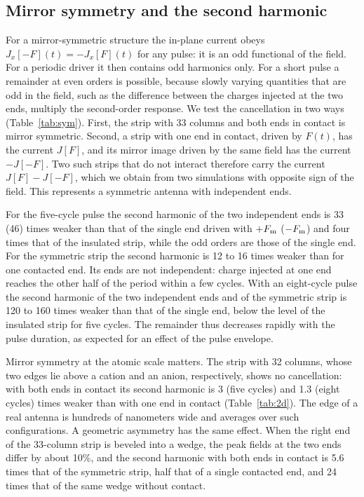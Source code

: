 \documentclass[aps,prl,onecolumn,superscriptaddress,notitlepage]{revtex4-2}
\begin{document}
\subsection{Mirror symmetry and the second harmonic}
For a mirror-symmetric structure the in-plane current obeys $J_x[-F](t)=-J_x[F](t)$ for any pulse:
it is an odd functional of the field. For a periodic driver it then contains odd harmonics only.
For a short pulse a remainder at even orders is possible, because slowly varying quantities that
are odd in the field, such as the difference between the charges injected at the two ends,
multiply the second-order response. We test the cancellation in two ways (Table~\ref{tab:sym}).
First, the strip with 33 columns and both ends in contact is mirror symmetric. Second, a strip with
one end in contact, driven by $F(t)$, has the current $J[F]$, and its mirror image driven by the same
field has the current $-J[-F]$. Two such strips that do not interact therefore carry the current
$J[F]-J[-F]$, which we obtain from two simulations with opposite sign of the field. This represents
a symmetric antenna with independent ends.

For the five-cycle pulse the second harmonic of the two independent ends is 33 (46) times weaker
than that of the single end driven with $+F_{\rm m}$ ($-F_{\rm m}$) and four times that of the
insulated strip, while the odd orders are those of the single end. For the symmetric strip the
second harmonic is 12 to 16 times weaker than for one contacted end. Its ends are not independent:
charge injected at one end reaches the other half of the period within a few cycles. With an eight-cycle pulse the second harmonic of the two independent ends and of the symmetric
strip is 120 to 160 times weaker than that of the single end, below the level of the insulated
strip for five cycles. The remainder thus decreases rapidly with the pulse duration, as expected for
an effect of the pulse envelope.

Mirror symmetry at the atomic scale matters. The strip with 32 columns, whose two edges lie above a
cation and an anion, respectively, shows no cancellation: with both ends in contact its second
harmonic is 3 (five cycles) and 1.3 (eight cycles) times weaker than with one end in contact
(Table~\ref{tab:2d}). The edge of a real antenna is hundreds of nanometers wide and averages over
such configurations. A geometric asymmetry has the same effect. When the right end of the 33-column
strip is beveled into a wedge, the peak fields at the two ends differ by about 10\%, and the second
harmonic with both ends in contact is 5.6 times that of the symmetric strip, half that of a single
contacted end, and 24 times that of the same wedge without contact.
\end{document}
